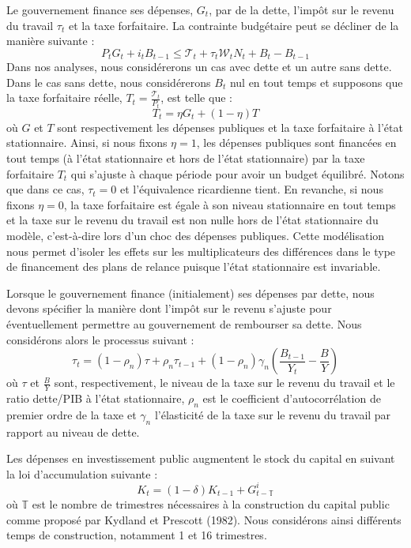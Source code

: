 \documentclass[12pt,letterpaper]{article}
\newcommand{\T}{\mathbb{T}}
\newcommand{\WW}{\mathcal{W}}
\newcommand{\TT}{\mathcal{T}}
\begin{document}
Le gouvernement finance ses dépenses, $G_t$, par de la dette, l’impôt sur le revenu du travail $\tau_t$ et la taxe forfaitaire. La contrainte budgétaire peut se décliner de la manière suivante :
\begin{equation}
P_t G_t + i_t B_{t-1} \leq \TT_t + \tau_t \WW_t N_t + B_t - B_{t-1} \tag{16}
\end{equation}
Dans nos analyses, nous considérerons un cas avec dette et un autre sans dette. Dans le cas sans dette, nous considérerons $B_t$ nul en tout temps et supposons que la taxe forfaitaire réelle, $T_t = \frac{\TT_t}{P_t}$, est telle que :
\begin{equation}
T_t = \eta G_t + (1-\eta)T \tag{17}
\end{equation}
où $G$ et $T$ sont respectivement les dépenses publiques et la taxe forfaitaire à l’état stationnaire. Ainsi, si nous fixons $\eta = 1$, les dépenses publiques sont financées en tout temps (à l’état stationnaire et hors de l’état stationnaire) par la taxe forfaitaire $T_t$ qui s’ajuste à chaque période pour avoir un budget équilibré. Notons que dans ce cas, $\tau_t = 0$ et l’équivalence ricardienne tient. En revanche, si nous fixons $\eta = 0$, la taxe forfaitaire est égale à son niveau stationnaire en tout temps et la taxe sur le revenu du travail est non nulle hors de l’état stationnaire du modèle, c’est-à-dire lors d’un choc des dépenses publiques. Cette modélisation nous permet d’isoler les effets sur les multiplicateurs des différences dans le type de financement des plans de relance puisque l’état stationnaire est invariable.

Lorsque le gouvernement finance (initialement) ses dépenses par dette, nous devons spécifier la manière dont l’impôt sur le revenu s’ajuste pour éventuellement permettre au gouvernement de rembourser sa dette. Nous considérons alors le processus suivant :
\begin{equation}
\tau_t = (1-\rho_n)\tau + \rho_n \tau_{t-1} + (1-\rho_n)\gamma_n\left(\frac{B_{t-1}}{Y_t} - \frac{B}{Y}\right) \tag{18}
\end{equation}
où $\tau$ et $\frac{B}{Y}$ sont, respectivement, le niveau de la taxe sur le revenu du travail et le ratio dette/PIB à l’état stationnaire, $\rho_n$ est le coefficient d’autocorrélation de premier ordre de la taxe et $\gamma_n$ l’élasticité de la taxe sur le revenu du travail par rapport au niveau de dette.

Les dépenses en investissement public augmentent le stock du capital en suivant la loi d’accumulation suivante :
\begin{equation}
K_t = (1-\delta)K_{t-1} + G^i_{t-\T} \tag{19}
\end{equation}
où $\T$ est le nombre de trimestres nécessaires à la construction du capital public comme proposé par Kydland et Prescott (1982). Nous considérons ainsi différents temps de construction, notamment 1 et 16 trimestres.
\end{document}
